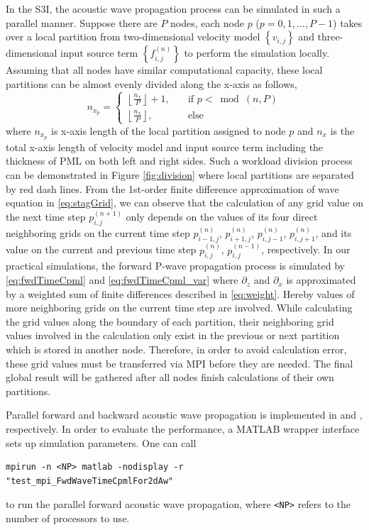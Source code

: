 \documentclass[11pt,titlepage]{article}
\theoremstyle{plain}
\theoremstyle{definition}
\theoremstyle{remark}
\numberwithin{equation}{section}
\begin{document}
In the S3I, the acoustic wave propagation process can be simulated in such a parallel manner. Suppose there are $P$ nodes, each node $p$ ($p=0, 1, \dots, P-1$) takes over a local partition from two-dimensional velocity model $\left\{v_{i,j}\right\}$ and three-dimensional input source term $\left\{f_{i,j}^{(n)}\right\}$ to perform the simulation locally. Assuming that all nodes have similar computational capacity, these local partitions can be almost evenly divided along the x-axis as follows, 
\begin{equation}
  \label{eq:mpiWorkDivision}
  n_{x_p} = \left\{
  \begin{aligned}
    \left\lfloor \frac{n_x}{P} \right\rfloor + 1, \quad &\text{if } p < \bmod(n, P) \\
    \left\lfloor \frac{n_x}{P} \right\rfloor, \quad &\text{else}
  \end{aligned}
  \right.
\end{equation}
where $n_{x_p}$ is x-axis length of the local partition assigned to node $p$ and $n_x$ is the total x-axis length of velocity model and input source term including the thickness of PML on both left and right sides. Such a workload division process can be demonstrated in Figure \ref{fig:division} where local partitions are separated by red dash lines. From the 1st-order finite difference approximation of wave equation in \eqref{eq:stagGrid}, we can observe that the calculation of any grid value on the next time step $p_{i,j}^{(n+1)}$ only depends on the values of its four direct neighboring grids on the current time step $p_{i-1,j}^{(n)}$, $p_{i+1,j}^{(n)}$, $p_{i,j-1}^{(n)}$, $p_{i,j+1}^{(n)}$, and its value on the current and previous time step $p_{i,j}^{(n)}$, $p_{i,j}^{(n-1)}$, respectively. In our practical simulations, the forward P-wave propagation process is simulated by \eqref{eq:fwdTimeCpml} and \eqref{eq:fwdTimeCpml_var} where $\partial_z$ and $\partial_x$ is approximated by a weighted sum of finite differences described in \eqref{eq:weight}. Hereby values of more neighboring grids on the current time step are involved. While calculating the grid values along the boundary of each partition, their neighboring grid values involved in the calculation only exist in the previous or next partition which is stored in another node. Therefore, in order to avoid calculation error, these grid values must be transferred via MPI before they are needed. The final global result will be gathered after all nodes finish calculations of their own partitions.

Parallel forward and backward acoustic wave propagation is implemented in  and , respectively. In order to evaluate the performance, a MATLAB wrapper interface  sets up simulation parameters. One can call 
\begin{lstlisting}[basicstyle=\ttfamily,keywordstyle=\color{blue}]
mpirun -n <NP> matlab -nodisplay -r
"test_mpi_FwdWaveTimeCpmlFor2dAw"
\end{lstlisting}
to run the parallel forward acoustic wave propagation, where \texttt{<NP>} refers to the number of processors to use.
\end{document}
